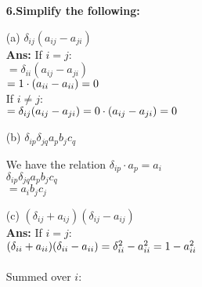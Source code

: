 \documentclass[a4paper,12pt]{article}
\begin{document}
\begin{enumerate}
\textbf{6.Simplify the following:}


    \item[(a)] $\delta_{ij}(a_{ij} - a_{ji})$ \\ \textbf{Ans:}  \noindent
{}
    If $i = j$:\\
    $ =\delta_{ii}(a_{ij} - a_{ji})$\\
    $= 1 \cdot (a_{ii} - a_{ii})\\ = 0$ \\ 
    
    If $i \ne j$: \\
    $=\delta_{ij}(a_{ij} - a_{ji})\\= 0 \cdot (a_{ij} - a_{ji})\\= 0$
    \\
    \item[(b)] $\delta_{ip} \delta_{jq} a_{p} b_{j} c_q$
    
    We have the relation $\boxed{\delta_{ip}\cdot a_{p}=a_{i}}$
    \\
    $\delta_{ip} \delta_{jq} a_{p} b_{j} c_{q}$ \\ 
    $= a_{i} b_{j} c_{j}$\\
    
   
 


 \item[(c)] $(\delta_{ij} + a_{ij})(\delta_{ij} - a_{ij})$ \\
    \noindent
{}
\textbf{Ans:}\quad
    If $i = j$: \\
    $(\delta_{ii} + a_{ii})(\delta_{ii} - a_{ii})\\ = \delta_{ii}^2 - a_{ii}^2\\ = 1 - a_{ii}^2$ \\
    \\Summed over $i$: \\


\end{enumerate}
\end{document}
